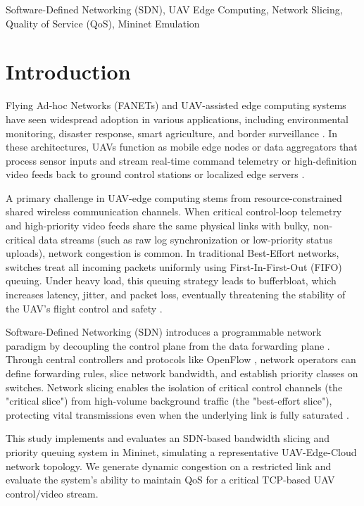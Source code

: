 \documentclass[conference]{IEEEtran}
\begin{document}
\begin{IEEEkeywords}
Software-Defined Networking (SDN), UAV Edge Computing, Network Slicing, Quality of Service (QoS), Mininet Emulation
\end{IEEEkeywords}

\section{Introduction}
Flying Ad-hoc Networks (FANETs) and UAV-assisted edge computing systems have seen widespread adoption in various applications, including environmental monitoring, disaster response, smart agriculture, and border surveillance \cite{b7}. In these architectures, UAVs function as mobile edge nodes or data aggregators that process sensor inputs and stream real-time command telemetry or high-definition video feeds back to ground control stations or localized edge servers \cite{b8}.

A primary challenge in UAV-edge computing stems from resource-constrained shared wireless communication channels. When critical control-loop telemetry and high-priority video feeds share the same physical links with bulky, non-critical data streams (such as raw log synchronization or low-priority status uploads), network congestion is common. In traditional Best-Effort networks, switches treat all incoming packets uniformly using First-In-First-Out (FIFO) queuing. Under heavy load, this queuing strategy leads to bufferbloat, which increases latency, jitter, and packet loss, eventually threatening the stability of the UAV's flight control and safety \cite{b1}.

Software-Defined Networking (SDN) introduces a programmable network paradigm by decoupling the control plane from the data forwarding plane \cite{b2}. Through central controllers and protocols like OpenFlow \cite{b9}, network operators can define forwarding rules, slice network bandwidth, and establish priority classes on switches. Network slicing enables the isolation of critical control channels (the "critical slice") from high-volume background traffic (the "best-effort slice"), protecting vital transmissions even when the underlying link is fully saturated \cite{b10}.

This study implements and evaluates an SDN-based bandwidth slicing and priority queuing system in Mininet, simulating a representative UAV-Edge-Cloud network topology. We generate dynamic congestion on a restricted link and evaluate the system's ability to maintain QoS for a critical TCP-based UAV control/video stream.
\end{document}
